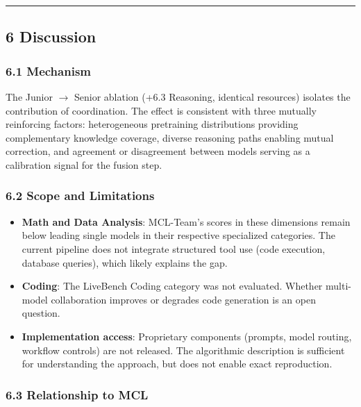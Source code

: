 \documentclass[
]{article}
\providecommand{\tightlist}{%
  \setlength{\itemsep}{0pt}\setlength{\parskip}{0pt}}
\begin{document}
\begin{center}\rule{0.5\linewidth}{0.5pt}\end{center}

\subsection{6 Discussion}\label{discussion}

\subsubsection{6.1 Mechanism}\label{mechanism}

The Junior $\rightarrow$ Senior ablation (+6.3 Reasoning, identical resources) isolates the contribution of coordination. The effect is consistent with three mutually reinforcing factors: heterogeneous pretraining distributions providing complementary knowledge coverage, diverse reasoning paths enabling mutual correction, and agreement or disagreement between models serving as a calibration signal for the fusion step.

\subsubsection{6.2 Scope and Limitations}\label{limitations}

\begin{itemize}
\tightlist
\item \textbf{Math and Data Analysis}: MCL-Team's scores in these dimensions remain below leading single models in their respective specialized categories. The current pipeline does not integrate structured tool use (code execution, database queries), which likely explains the gap.
\item \textbf{Coding}: The LiveBench Coding category was not evaluated. Whether multi-model collaboration improves or degrades code generation is an open question.
\item \textbf{Implementation access}: Proprietary components (prompts, model routing, workflow controls) are not released. The algorithmic description is sufficient for understanding the approach, but does not enable exact reproduction.
\end{itemize}

\subsubsection{6.3 Relationship to MCL}\label{relationship}
\end{document}
